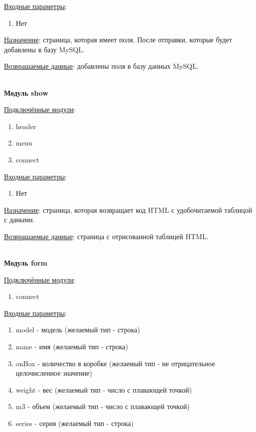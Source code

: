 \underline{Входные параметры}:

\begin{enumerate}
    \item Нет
\end{enumerate}

\underline{Назначение}: страница, которая имеет поля. После отправки, которые будет добавлены в базу MySQL.

\underline{Возвращаемые данные}: добавлены поля в базу данных MySQL.

\hspace{0pt}\\


\textbf{Модуль show}

\underline{Подключённые модули}:

\begin{enumerate}
    \item header
    \item menu
    \item connect
\end{enumerate}

\underline{Входные параметры}:

\begin{enumerate}
    \item Нет
\end{enumerate}

\underline{Назначение}: страница, которая возвращает код HTML с удобочитаемой таблицой с даными.

\underline{Возвращаемые данные}: страница с отрисованной таблицей HTML.

\hspace{0pt}\\


\textbf{Модуль form}

\underline{Подключённые модули}:

\begin{enumerate}
    \item connect
\end{enumerate}

\underline{Входные параметры}:

\begin{enumerate}
    \item model - модель (желаемый тип - строка)
    \item name - имя (желаемый тип - строка)
    \item onBox - количество в коробке (желаемый тип - не отрицательное целочисленное значение)
    \item weight - вес (желаемый тип - число с плавающей точкой)
    \item m3 - объем (желаемый тип - число с плавающей точкой)     
    \item series - серия (желаемый тип - строка) 
\end{enumerate}

